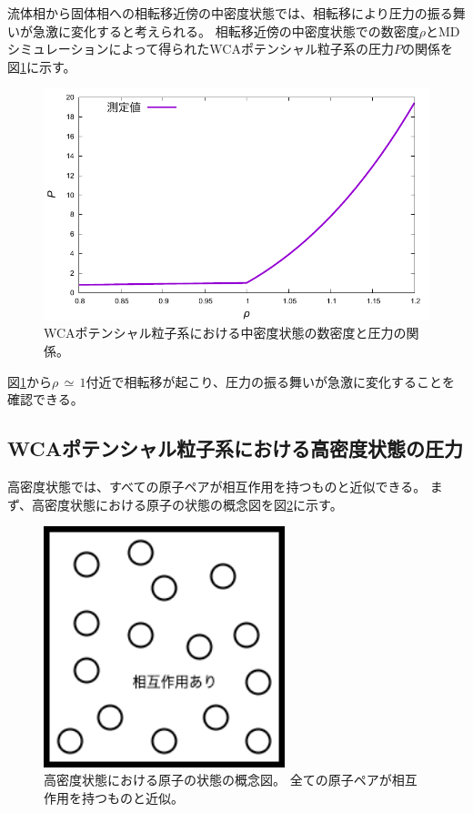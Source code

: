\documentclass[titlepage]{jsreport}
\begin{document}
{{{流体相から固体相への相転移近傍の中密度状態では、相転移により圧力の振る舞いが急激に変化すると考えられる。
相転移近傍の中密度状態での数密度$\rho$とMDシミュレーションによって得られたWCAポテンシャル粒子系の圧力$P$の関係を
図\ref{fig:middleden_den-pre}に示す。

\newpage
\begin{figure}[htbp]
    \begin{center}
        \includegraphics[width=14cm]{fig/middleden_den-pre.pdf}
    \end{center}
    \caption{WCAポテンシャル粒子系における中密度状態の数密度と圧力の関係。}
    \label{fig:middleden_den-pre}
\end{figure}


図\ref{fig:middleden_den-pre}から$\rho\,{\simeq}\,1$付近で相転移が起こり、圧力の振る舞いが急激に変化することを確認できる。

\newpage
\subsection{WCAポテンシャル粒子系における高密度状態の圧力}\label{results-subsec:WCA-press-high-density}
高密度状態では、すべての原子ペアが相互作用を持つものと近似できる。
まず、高密度状態における原子の状態の概念図を図\ref{fig:highdensity.png}に示す。

\begin{figure}[htbp]
    \begin{center}
        \includegraphics[width=7cm]{fig/highdensity.png}
    \end{center}
    \caption{高密度状態における原子の状態の概念図。
    全ての原子ペアが相互作用を持つものと近似。}
    \label{fig:highdensity.png}
\end{figure}


}}}
\end{document}
